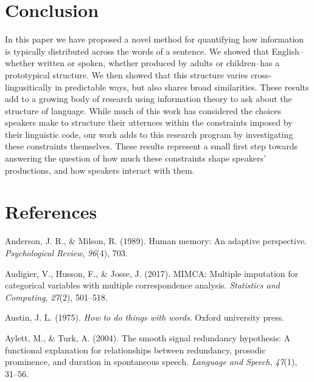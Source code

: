 \documentclass[10pt, letterpaper]{article}
\begin{document}
\hypertarget{conclusion}{%
\section{Conclusion}\label{conclusion}}

In this paper we have proposed a novel method for quantifying how
information is typically distributed across the words of a sentence. We
showed that English--whether written or spoken, whether produced by
adults or children--has a prototypical structure. We then showed that
this structure varies cross-lingusitically in predictable ways, but also
shares broad similarities. These results add to a growing body of
research using information theory to ask about the structure of
language. While much of this work has considered the choices speakers
make to structure their utternces within the constraints imposed by
their linguistic code, our work adds to this research program by
investigating these constraints themselves. These results represent a
small first step towards answering the question of how much these
constraints shape speakers' productions, and how speakers interact with
them.

\hypertarget{references}{%
\section{References}\label{references}}

\setlength{\parindent}{-0.1in} 
\setlength{\leftskip}{0.125in}

\noindent

\hypertarget{refs}{}
\leavevmode\hypertarget{ref-anderson1989}{}%
Anderson, J. R., \& Milson, R. (1989). Human memory: An adaptive
perspective. \emph{Psychological Review}, \emph{96}(4), 703.

\leavevmode\hypertarget{ref-audigier2017}{}%
Audigier, V., Husson, F., \& Josse, J. (2017). MIMCA: Multiple
imputation for categorical variables with multiple correspondence
analysis. \emph{Statistics and Computing}, \emph{27}(2), 501--518.

\leavevmode\hypertarget{ref-austin1975}{}%
Austin, J. L. (1975). \emph{How to do things with words}. Oxford
university press.

\leavevmode\hypertarget{ref-aylett2004}{}%
Aylett, M., \& Turk, A. (2004). The smooth signal redundancy hypothesis:
A functional explanation for relationships between redundancy, prosodic
prominence, and duration in spontaneous speech. \emph{Language and
Speech}, \emph{47}(1), 31--56.
\end{document}
